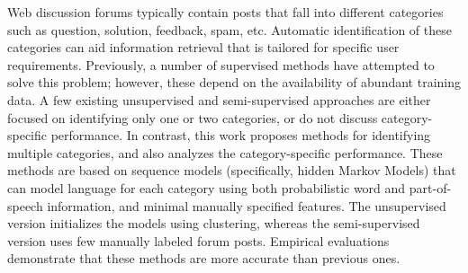 Web discussion forums typically contain posts that fall into different categories such as question, solution, feedback, spam, etc. Automatic identification of these categories can aid information retrieval that is tailored for specific user requirements. Previously, a number of supervised methods have attempted to solve this problem; however, these depend on the availability of abundant training data. A few existing unsupervised and semi-supervised approaches are either focused on identifying only one or two categories, or do not discuss category-specific performance. In contrast, this work proposes methods for identifying multiple categories, and also analyzes the category-specific performance. These methods are based on sequence models (specifically, hidden Markov Models) that can model language for each category using both probabilistic word and part-of-speech information, and minimal manually specified features. The unsupervised version initializes the models using clustering, whereas the semi-supervised version uses few manually labeled forum posts. Empirical evaluations demonstrate that these methods are more accurate than previous ones.
